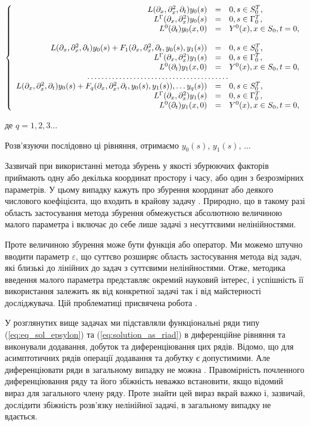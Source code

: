 $$
\left\{
\begin{array}{rcl}
L(\partial_x, \partial_x^2, \partial_t) y_0(s) & = & 0, s\in S_0^T, \\
L^\Gamma(\partial_x, \partial_x^2)y_0(s) & = & 0, s \in \Gamma_0^T,  \\
L^0(\partial_t)y_0(x, 0) & = & Y^0(x), x \in S_0, t = 0,
\\
\\
L(\partial_x, \partial_x^2, \partial_t) y_0(s) + F_1(\partial_x, \partial_x^2, \partial_t, y_0(s), y_1(s)) & = & 0, s\in S_0^T, \\
L^\Gamma(\partial_x, \partial_x^2)y_1(s) & = & 0, s \in \Gamma_0^T,  \\
L^0(\partial_t)y_1(x, 0) & = & Y^0(x), x \in S_0, t = 0,
\\
\hdotsfor{3}
\\
L(\partial_x, \partial_x^2, \partial_t) y_0(s) + F_q(\partial_x, \partial_x^2, \partial_t, y_0(s), y_1(s)), \ldots y_q(s)) & = & 0, s\in S_0^T, \\
L^\Gamma(\partial_x, \partial_x^2)y_1(s) & = & 0, s \in \Gamma_0^T,  \\
L^0(\partial_t)y_1(x, 0) & = & Y^0(x), x \in S_0, t = 0,
\end{array}
\right.
$$

де $q = 1, 2, 3\ldots$

Розв’язуючи послідовно ці рівняння, отримаємо $y_0(s)$, $y_1(s)$, $\ldots$

Зазвичай при використанні метода збурень у якості збурюючих факторів приймають одну або декілька координат простору і
часу, або один з безрозмірних параметрів. У цьому випадку кажуть про збурення координат або деякого числового
коефіцієнта, що входить в крайову задачу \cite{Van-Dayk-Metody, Kozdoba-Reshenie}. Природно, що в такому разі область застосування метода збурення
обмежується абсолютною величиною малого параметра і включає до себе лише задачі з несуттєвими нелінійностями.

Проте величиною збурення може бути функція або оператор. Ми можемо штучно вводити параметр $\varepsilon$, що суттєво розширяє
область застосування метода від задач, які близькі до лінійних до задач з суттєвими нелінйностями. Отже, методика
введення малого параметра представляє окремий науковий інтерес, і успішність її використання залежить як від
конкретної задачі так і від майстерності досліджувача. Цій проблематиці присвячена робота \cite{Marin-Issledovanie}.

У розглянутих вище задачах ми підставляли функціональні ряди типу (\ref{eq:eq_sol_epsylon}) та (\ref{eq:solution_as_riad})
в диференційне рівняння та виконували
додавання, добуток та диференціювання цих рядів. Відомо, що для асимптотичних рядів операції додавання та добутку
є допустимими. Але диференціювати ряди в загальному випадку не можна \cite{Erdein-Asimptoticheskie}. Правомірність почленного диференціювання
ряду та його збіжність неважко встановити, якщо відомий вираз для загального члену ряду. Проте знайти цей вираз
вкрай важко і, зазвичай, дослідити збіжність розв’язку нелінійної задачі, в загальному випадку не вдається.

